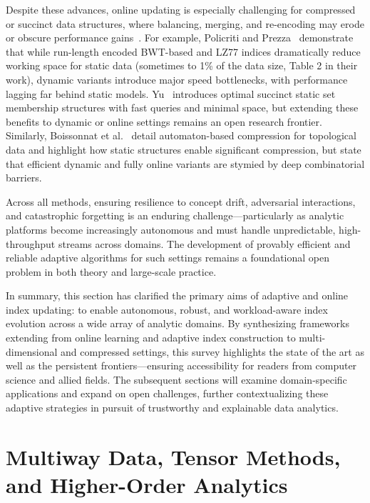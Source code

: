 \documentclass[sigconf]{acmart}
\begin{document}
Despite these advances, online updating is especially challenging for compressed or succinct data structures, where balancing, merging, and re-encoding may erode or obscure performance gains~\cite{ref80,ref81,ref82,ref108,ref109}. For example, Policriti and Prezza~\cite{ref80} demonstrate that while run-length encoded BWT-based and LZ77 indices dramatically reduce working space for static data (sometimes to 1\% of the data size, Table 2 in their work), dynamic variants introduce major speed bottlenecks, with performance lagging far behind static models. Yu~\cite{ref82} introduces optimal succinct static set membership structures with fast queries and minimal space, but extending these benefits to dynamic or online settings remains an open research frontier. Similarly, Boissonnat et al.~\cite{ref79} detail automaton-based compression for topological data and highlight how static structures enable significant compression, but state that efficient dynamic and fully online variants are stymied by deep combinatorial barriers.

Across all methods, ensuring resilience to concept drift, adversarial interactions, and catastrophic forgetting is an enduring challenge---particularly as analytic platforms become increasingly autonomous and must handle unpredictable, high-throughput streams across domains. The development of provably efficient and reliable adaptive algorithms for such settings remains a foundational open problem in both theory and large-scale practice.

\bigskip

In summary, this section has clarified the primary aims of adaptive and online index updating: to enable autonomous, robust, and workload-aware index evolution across a wide array of analytic domains. By synthesizing frameworks extending from online learning and adaptive index construction to multi-dimensional and compressed settings, this survey highlights the state of the art as well as the persistent frontiers---ensuring accessibility for readers from computer science and allied fields. The subsequent sections will examine domain-specific applications and expand on open challenges, further contextualizing these adaptive strategies in pursuit of trustworthy and explainable data analytics.

\section{Multiway Data, Tensor Methods, and Higher-Order Analytics}
\end{document}
